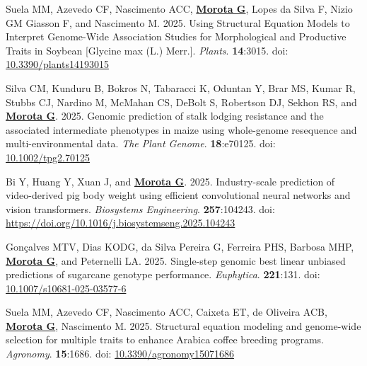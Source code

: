 \documentclass[margin,line,10pt]{res}
\newenvironment{list1}{
  \begin{list}{\ding{113}}{%
      \setlength{\itemsep}{0in}
      \setlength{\parsep}{0in} \setlength{\parskip}{0in}
      \setlength{\topsep}{0in} \setlength{\partopsep}{0in} 
      \setlength{\leftmargin}{0.17in}}}{\end{list}}
\begin{document}
\begin{resume}
\begin{list1}
  \item  [{\bf 88}.] Suela MM, Azevedo CF, Nascimento ACC, \textbf{\underline{Morota G}}, Lopes da Silva F, Nizio GM  Giasson F, and Nascimento M. 2025. Using Structural Equation Models to Interpret Genome-Wide Association Studies for Morphological and Productive Traits in Soybean [Glycine max (L.) Merr.].  \emph{Plants}. \textbf{14}:3015. doi: \textcolor{blue}{\href{https://doi.org/10.3390/plants141930155}{10.3390/plants14193015}}

  \vspace{0.5cm}

  \item  [{\bf 87}.] Silva CM, Kunduru B, Bokros N, Tabaracci K, Oduntan Y, Brar MS, Kumar R, Stubbs CJ, Nardino M, McMahan CS, DeBolt S, Robertson DJ, Sekhon RS, and \textbf{\underline{Morota G}}. 2025. Genomic prediction of stalk lodging resistance and the associated intermediate phenotypes in maize using whole-genome resequence and multi-environmental data. \emph{The Plant Genome}. \textbf{18}:e70125. doi: \textcolor{blue}{\href{https://doi.org/10.1002/tpg2.70125}{10.1002/tpg2.70125}}

  \vspace{0.5cm}

  \item  [{\bf 86}.] Bi Y, Huang Y, Xuan J, and \textbf{\underline{Morota G}}. 2025. Industry-scale prediction of video-derived pig body weight using efficient convolutional neural networks and vision transformers. \emph{Biosystems Engineering}.  \textbf{257}:104243. doi: \textcolor{blue}{\href{https://doi.org/10.1016/j.biosystemseng.2025.104243}{https://doi.org/10.1016/j.biosystemseng.2025.104243}}

  \vspace{0.5cm}

  \item [{\bf 85}.] Gon\c{c}alves MTV, Dias KODG, da Silva Pereira G, Ferreira PHS, Barbosa MHP, \textbf{\underline{Morota G}}, and Peternelli LA. 2025. Single-step genomic best linear unbiased predictions of sugarcane genotype performance. \emph{Euphytica}. \textbf{221}:131. doi: \textcolor{blue}{\href{https://doi.org/10.1007/s10681-025-03577-6}{10.1007/s10681-025-03577-6}}

  \vspace{0.5cm}

  \item  [{\bf 84}.] Suela MM, Azevedo CF, Nascimento ACC, Caixeta ET, de Oliveira ACB, \textbf{\underline{Morota G}}, Nascimento M. 2025. Structural equation modeling and genome-wide selection for multiple traits to enhance Arabica coffee breeding programs. \emph{Agronomy}. \textbf{15}:1686. doi: \textcolor{blue}{\href{https://doi.org/10.3390/agronomy15071686}{10.3390/agronomy15071686}}



\end{list1}
\end{resume}
\end{document}
